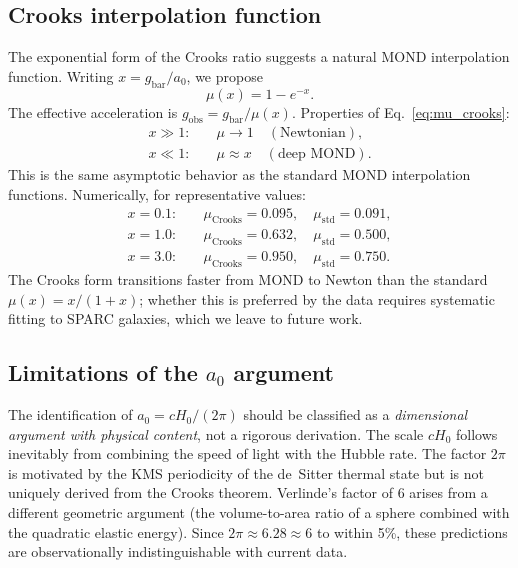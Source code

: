 \documentclass[prd,twocolumn,superscriptaddress,longbibliography,floatfix]{revtex4-2}
\begin{document}
\subsection{Crooks interpolation function}

The exponential form of the Crooks ratio suggests a natural
MOND interpolation function.  Writing $x = g_{\mathrm{bar}}/a_0$,
we propose
\begin{equation}
\mu(x) = 1 - e^{-x}.
\label{eq:mu_crooks}
\end{equation}
The effective acceleration is
$g_{\mathrm{obs}} = g_{\mathrm{bar}}/\mu(x)$.
Properties of Eq.~\eqref{eq:mu_crooks}:
\begin{align}
x \gg 1:&\quad \mu \to 1 \quad (\text{Newtonian}),
\nonumber\\
x \ll 1:&\quad \mu \approx x \quad (\text{deep MOND}).
\nonumber
\end{align}
This is the same asymptotic behavior as the standard MOND
interpolation functions.  Numerically, for representative
values:
\begin{align}
x = 0.1:&\quad \mu_{\mathrm{Crooks}} = 0.095,\quad
\mu_{\mathrm{std}} = 0.091,
\nonumber\\
x = 1.0:&\quad \mu_{\mathrm{Crooks}} = 0.632,\quad
\mu_{\mathrm{std}} = 0.500,
\nonumber\\
x = 3.0:&\quad \mu_{\mathrm{Crooks}} = 0.950,\quad
\mu_{\mathrm{std}} = 0.750.
\nonumber
\end{align}
The Crooks form transitions faster from MOND to Newton than
the standard $\mu(x) = x/(1+x)$; whether this is preferred by
the data requires systematic fitting to SPARC galaxies, which
we leave to future work.

\subsection{Limitations of the $a_0$ argument}

The identification of $a_0 = cH_0/(2\pi)$ should be classified as
a \emph{dimensional argument with physical content}, not a
rigorous derivation.  The scale $cH_0$ follows inevitably from
combining the speed of light with the Hubble rate.  The factor
$2\pi$ is motivated by the KMS periodicity of the de~Sitter
thermal state but is not uniquely derived from the Crooks
theorem.  Verlinde's factor of 6 arises from a different
geometric argument (the volume-to-area ratio of a sphere
combined with the quadratic elastic energy).  Since
$2\pi \approx 6.28 \approx 6$ to within 5\%, these
predictions are observationally indistinguishable with current
data.
\end{document}
